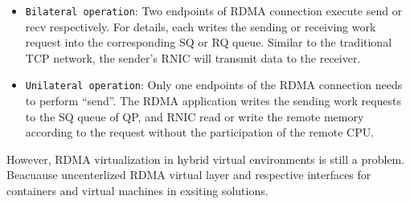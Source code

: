 \begin{itemize}
\item {\verb|Bilateral operation|}: Two endpoints of RDMA connection execute send or recv respectively. For details, each writes the sending or receiving work request into the corresponding SQ or RQ queue. Similar to the traditional TCP network, the sender's RNIC will transmit data to the receiver.

\item {\verb|Unilateral operation|}: Only one endpoints of the RDMA connection needs to perform ``send''. The RDMA application writes the sending work requests to the SQ queue of QP, and RNIC read or write the remote memory according to the request without the participation of the remote CPU.
\end{itemize}

However, RDMA virtualization in hybrid virtual environments is still a problem. Beacuause uncenterlized RDMA virtual layer and respective interfaces for containers and virtual machines in exsiting solutions. 

